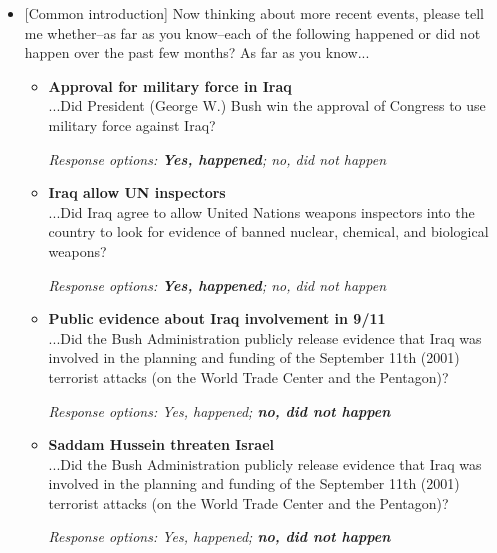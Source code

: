 \documentclass[12pt, letterpaper]{article}
\begin{document}
\begin{itemize} 
\item {[Common introduction] Now thinking about more recent events, please tell me whether--as far as you know--each of the following happened or did not happen over the past few months? As far as you know...
   
\begin{itemize} 
\item \textbf{Approval for military force in Iraq}\\
...Did President (George W.) Bush win the approval of Congress to use military force against Iraq?

\textit{Response options: \textbf{Yes, happened}; no, did not happen}
\end{itemize}

\begin{itemize} \item \textbf{Iraq allow UN inspectors}\\
...Did Iraq agree to allow United Nations weapons inspectors into the country to look for evidence of banned nuclear, chemical, and biological weapons?

\textit{Response options: \textbf{Yes, happened}; no, did not happen} 
\end{itemize}

\begin{itemize} \item \textbf{Public evidence about Iraq involvement in 9/11}\\
...Did the Bush Administration publicly release evidence that Iraq was involved in the planning and funding of the September 11th (2001) terrorist attacks (on the World Trade Center and the Pentagon)?

\textit{Response options: Yes, happened; \textbf{no, did not happen}} 
\end{itemize}

\begin{itemize} \item \textbf{Saddam Hussein threaten Israel}\\
...Did the Bush Administration publicly release evidence that Iraq was involved in the planning and funding of the September 11th (2001) terrorist attacks (on the World Trade Center and the Pentagon)?

\textit{Response options: Yes, happened; \textbf{no, did not happen}} 
\end{itemize}}

\end{itemize}
\end{document}
